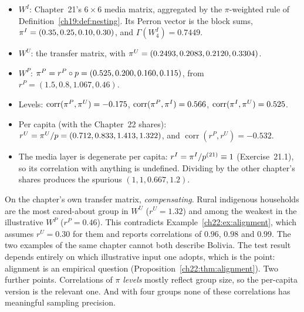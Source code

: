 \documentclass[../solutions_manual.tex]{subfiles}
\begin{document}
\begin{itemize}
\item $W^I$: Chapter~21's $6\times6$ media matrix, aggregated by the $\pi$-weighted rule of Definition~\ref{ch19:def:nesting}. Its Perron vector is the block sums, $\pi^I = (0.35, 0.25, 0.10, 0.30)$, and $\Gamma(W^I_4) = 0.7449$.
\item $W^U$: the transfer matrix, with $\pi^U = (0.2493, 0.2083, 0.2120, 0.3304)$.
\item $W^P$: $\pi^P = r^P \circ p = (0.525, 0.200, 0.160, 0.115)$, from $r^P = (1.5, 0.8, 1.067, 0.46)$.
\end{itemize}

\begin{itemize}
\item Levels: $\operatorname{corr}(\pi^P, \pi^U) = -0.175$, $\operatorname{corr}(\pi^P, \pi^I) = 0.566$, $\operatorname{corr}(\pi^I, \pi^U) = 0.525$.
\item Per capita (with the Chapter~22 shares): $r^U = \pi^U/p = (0.712, 0.833, 1.413, 1.322)$, and $\operatorname{corr}(r^P, r^U) = -0.532$.
\item The media layer is degenerate per capita: $r^I = \pi^I/p^{(21)} \equiv 1$ (Exercise~21.1), so its correlation with anything is undefined. Dividing by the other chapter's shares produces the spurious $(1, 1, 0.667, 1.2)$.
\end{itemize}

 On the chapter's own transfer matrix, \emph{compensating}. Rural indigenous households are the most cared-about group in $W^U$ ($r^U = 1.32$) and among the weakest in the illustrative $W^P$ ($r^P = 0.46$). This contradicts Example~\ref{ch22:ex:alignment}, which assumes $r^U = 0.30$ for them and reports correlations of $0.96$, $0.98$ and $0.99$. The two examples of the same chapter cannot both describe Bolivia. The test result depends entirely on which illustrative input one adopts, which is the point: alignment is an empirical question (Proposition~\ref{ch22:thm:alignment}). Two further points. Correlations of $\pi$ \emph{levels} mostly reflect group size, so the per-capita version is the relevant one. And with four groups none of these correlations has meaningful sampling precision.

\end{document}
